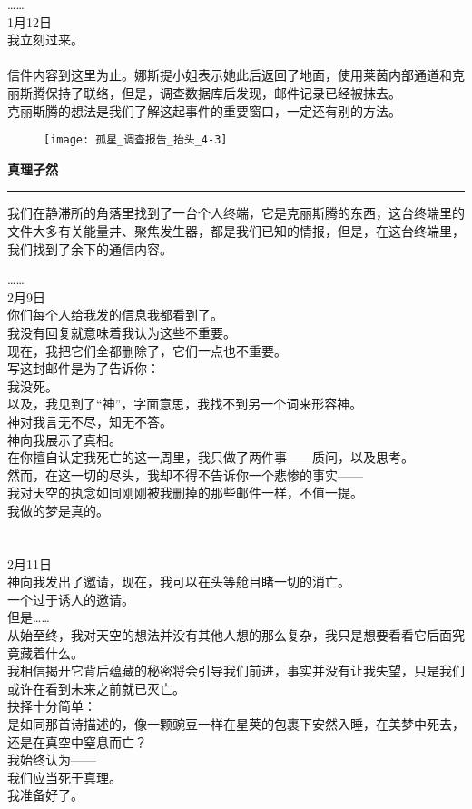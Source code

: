 \documentclass[openany]{book}
\begin{document}
\par
……\\
{
1月12日\\
我立刻过来。}\\
\\
信件内容到这里为止。娜斯提小姐表示她此后返回了地面，使用莱茵内部通道和克丽斯腾保持了联络，但是，调查数据库后发现，邮件记录已经被抹去。\\
克丽斯腾的想法是我们了解这起事件的重要窗口，一定还有别的方法。
\clearpage

\begin{figure}[h]
    \centering
    \texttt{[image: 孤星\_调查报告\_抬头\_4-3]}
\end{figure}
{\Large\textbf{真理孑然}}\par\noindent\rule{\textwidth}{0.4pt}
我们在静滞所的角落里找到了一台个人终端，它是克丽斯腾的东西，这台终端里的文件大多有关能量井、聚焦发生器，都是我们已知的情报，但是，在这台终端里，我们找到了余下的通信内容。\par
……\\
{
2月9日\\
你们每个人给我发的信息我都看到了。\\
我没有回复就意味着我认为这些不重要。\\
现在，我把它们全都删除了，它们一点也不重要。\\
写这封邮件是为了告诉你：\\
我没死。\\
以及，我见到了“神”，字面意思，我找不到另一个词来形容神。\\
神对我言无不尽，知无不答。\\
神向我展示了真相。\\
在你擅自认定我死亡的这一周里，我只做了两件事——质问，以及思考。\\
然而，在这一切的尽头，我却不得不告诉你一个悲惨的事实——\\
我对天空的执念如同刚刚被我删掉的那些邮件一样，不值一提。\\
我做的梦是真的。}\\
\\
\\
{
2月11日\\
神向我发出了邀请，现在，我可以在头等舱目睹一切的消亡。\\
一个过于诱人的邀请。\\
但是……\\
从始至终，我对天空的想法并没有其他人想的那么复杂，我只是想要看看它后面究竟藏着什么。\\
我相信揭开它背后蕴藏的秘密将会引导我们前进，事实并没有让我失望，只是我们或许在看到未来之前就已灭亡。\\
抉择十分简单：\\
是如同那首诗描述的，像一颗豌豆一样在星荚的包裹下安然入睡，在美梦中死去，还是在真空中窒息而亡？\\
我始终认为——\\
我们应当死于真理。\\
我准备好了。}\\
\end{document}
